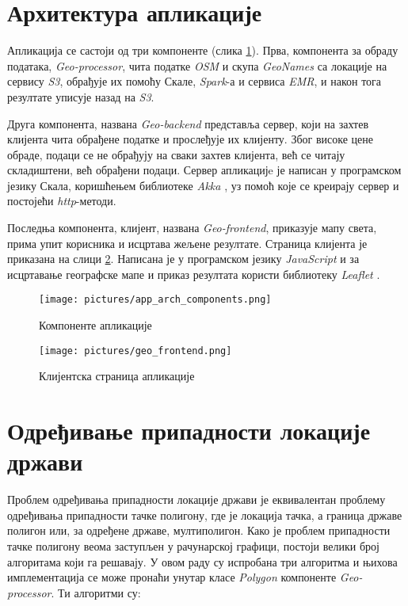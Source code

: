 \documentclass[12pt,oneside]{memoir}
\begin{document}
\section{Архитектура апликације}
\label{sec:app_aphi}

Апликација се састоји од три компоненте (слика \ref{fig:app_components}). Прва, компонента за обраду података, \textit{Geo-processor}, чита податке \textit{OSM} и скупа \textit{GeoNames} са локације на сервису \textit{S3}, обрађује их помоћу Скале, \textit{Spark}-а и сервиса \textit{EMR}, и након тога резултате уписује назад на \textit{S3}. 

Друга компонента, названа \textit{Geo-backend} представља сервер, који на захтев клијента чита обрађене податке и прослеђује их клијенту. Због високе цене обраде, подаци се не обрађују на сваки захтев клијента, већ се читају складиштени, већ обрађени подаци. Сервер апликацијe је написан у програмском језику Скала, коришћењем библиотеке \textit{Akka} \cite{scala_akka}, уз помоћ које се креирају сервер и постојећи \textit{http}-методи.

Последња компонента, клијент, названа \textit{Geo-frontend}, приказује мапу света, прима упит корисника и исцртава жељене резултате. Страница клијента је приказана на слици \ref{fig:app_front}. Написана је у програмском језику \textit{JavaScript} и за исцртавање географске мапе и приказ резултата користи библиотеку \textit{Leaflet} \cite{leaflet}.

\begin{figure}[!ht]
  \centering
  \texttt{[image: pictures/app\_arch\_components.png]}
  \caption{Компоненте апликације}
  \label{fig:app_components}
\end{figure}

\begin{figure}[!ht]
  \centering
  \texttt{[image: pictures/geo\_frontend.png]}
  \caption{Клијентска страница апликације}
  \label{fig:app_front}
\end{figure}

\section{Одређивање припадности локације држави}
\label{sec:poly_cont}

Проблем одређивања припадности локације држави је еквивалентан проблему одређивања припадности тачке полигону, где је локација тачка, а граница државе полигон или, за одређене државе, мултиполигон. Како је проблем припадности тачке полигону веома заступљен у рачунарској графици, постоји велики број алгоритама који га решавају. У овом раду су испробана три алгоритма и њихова имплементација се може пронаћи унутар класе \textit{Polygon} компоненте \textit{Geo-processor}. Ти алгоритми су:
\end{document}
